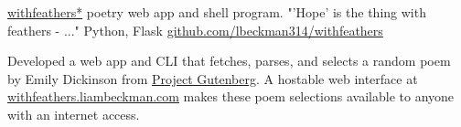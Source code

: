 \showoff
{\textcolor{my-blue}{\href{https://withfeathers.liambeckman.com}{withfeathers*}}}
{poetry web app and shell program. "'Hope' is the thing with feathers - ..."}
{Python, Flask}
{\textcolor{my-blue}{\href{https://github.com/lbeckman314/withfeathers}{github.com/lbeckman314/withfeathers}}}

Developed a web app and CLI that fetches, parses, and selects a random poem by Emily Dickinson from \textcolor{my-blue}{\href{https://www.gutenberg.org/ebooks/12242}{Project Gutenberg}}. A hostable web interface at \textcolor{my-blue}{\href{https://withfeathers.liambeckman.com}{withfeathers.liambeckman.com}} makes these poem selections available to anyone with an internet access.

\myBreak

